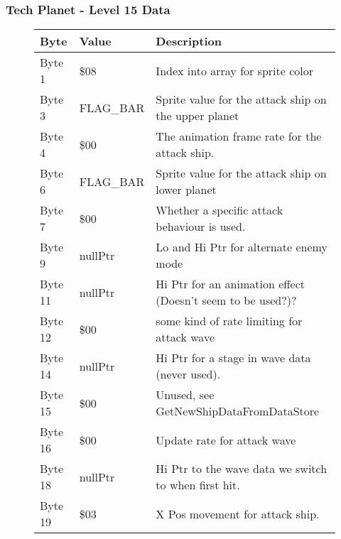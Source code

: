 \clearpage
\subsubsection{Tech Planet - Level 15 Data}

\begin{figure}[H]
  {
  \setlength{\tabcolsep}{3.0pt}
  \setlength\cmidrulewidth{\heavyrulewidth} %
  \begin{adjustbox}{width=12cm}

\begin{tabular}{lll}
\toprule
 Byte    & Value                      & Description                                                        \\
\midrule
 Byte 1  & \$08                        & Index into array for sprite color                                  \\
 Byte 3  & FLAG\_BAR                   & Sprite value for the attack ship on the upper planet               \\
 Byte 4  & \$00                        & The animation frame rate for the attack ship.                      \\
 Byte 6  & FLAG\_BAR                   & Sprite value for the attack ship on lower planet                   \\
 Byte 7  & \$00                        & Whether a specific attack behaviour is used.                       \\
 Byte 9  & nullPtr                    & Lo and Hi Ptr for alternate enemy mode                             \\
 Byte 11 & nullPtr                    & Hi Ptr for an animation effect (Doesn't seem to be used?)?         \\
 Byte 12 & \$00                        & some kind of rate limiting for attack wave                         \\
 Byte 14 & nullPtr                    & Hi Ptr for a stage in wave data (never used).                      \\
 Byte 15 & \$00                        & Unused, see GetNewShipDataFromDataStore                            \\
 Byte 16 & \$00                        & Update rate for attack wave                                        \\
 Byte 18 & nullPtr                    & Hi Ptr to the wave data we switch to when first hit.               \\
 Byte 19 & \$03                        & X Pos movement for attack ship.                                    \\

\end{tabular}
\end{adjustbox}}
\end{figure}
